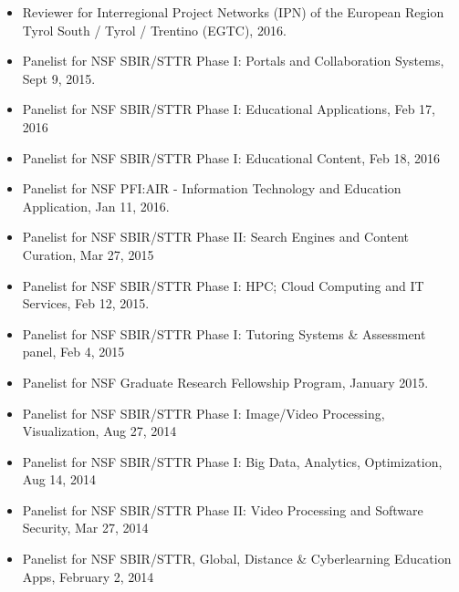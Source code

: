 %
%

\begin{itemize}

\item Reviewer for Interregional Project Networks (IPN) of the European Region Tyrol South / Tyrol / Trentino (EGTC), 2016.

\item Panelist for NSF SBIR/STTR Phase I: Portals and Collaboration Systems, Sept 9, 2015.

\item Panelist for NSF SBIR/STTR Phase I: Educational Applications, Feb 17, 2016

\item Panelist for NSF SBIR/STTR Phase I: Educational Content, Feb 18, 2016

\item Panelist for NSF PFI:AIR - Information Technology and Education Application, Jan 11, 2016.

\item Panelist for NSF SBIR/STTR Phase II: Search Engines and Content Curation, Mar 27, 2015

\item Panelist for NSF SBIR/STTR Phase I: HPC; Cloud Computing and IT Services, Feb 12, 2015.

\item Panelist for NSF SBIR/STTR Phase I: Tutoring Systems \& Assessment panel, Feb 4, 2015

\item Panelist for NSF Graduate Research Fellowship Program, January 2015.

\item Panelist for NSF SBIR/STTR Phase I: Image/Video Processing, Visualization, Aug 27, 2014

\item Panelist for NSF SBIR/STTR Phase I: Big Data, Analytics, Optimization, Aug 14, 2014

\item Panelist for NSF SBIR/STTR Phase II: Video Processing and Software Security, Mar 27, 2014

\item Panelist for NSF SBIR/STTR, Global, Distance \& Cyberlearning Education Apps, February 2, 2014


\end{itemize}
